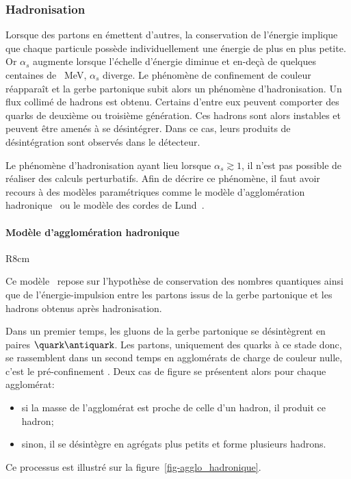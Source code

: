 \subsubsection{Hadronisation}\label{chapter-MSSM-formation_jets-subsec-hadronisation}
Lorsque des partons en émettent d'autres, la conservation de l'énergie implique que chaque particule possède individuellement une énergie de plus en plus petite.
Or $\alpha_s$ augmente lorsque l'échelle d'énergie diminue et en-deçà de quelques centaines de \SI{}{\MeV}, $\alpha_s$ diverge.
Le phénomène de confinement de couleur réapparaît et la gerbe partonique subit alors un phénomène d'hadronisation.
Un flux collimé de hadrons est obtenu.
Certains d'entre eux peuvent comporter des quarks de deuxième ou troisième génération. Ces hadrons sont alors instables et peuvent être amenés à se désintégrer.
Dans ce cas, leurs produits de désintégration sont observés dans le détecteur.
\par Le phénomène d'hadronisation ayant lieu lorsque $\alpha_s\gtrsim1$, il n'est pas possible de réaliser des calculs perturbatifs. Afin de décrire ce phénomène, il faut avoir recours à des modèles paramétriques comme
le modèle d'agglomération hadronique~\cite{Winter_2004}
ou
le modèle des cordes de Lund~\cite{Andersson_parton_fragmentation}.
\paragraph{Modèle d'agglomération hadronique}\label{chapter-MSSM-formation_jets-subsec-hadronisation-subsubsec-agglo_hadronique}
\begin{wrapfigure}{R}{8cm}
\centering

\caption[Formation de jets dans le cadre du modèle d'agglomération hadronique.]{Schématisation de l'hadronisation dans le cadre du modèle d'agglomération hadronique.}
\label{fig-agglo_hadronique}
\end{wrapfigure}
Ce modèle~\cite{Winter_2004} repose sur l'hypothèse de conservation des nombres quantiques ainsi que de l'énergie-impulsion entre les partons issus de la gerbe partonique et les hadrons obtenus après hadronisation.
\par Dans un premier temps, les gluons de la gerbe partonique se désintègrent en paires $\quark\antiquark$. Les partons, uniquement des quarks à ce stade donc, se rassemblent dans un second temps en agglomérats de charge de couleur nulle, c'est le \og pré-confinement \fg.
Deux cas de figure se présentent alors pour chaque agglomérat:
\begin{itemize}
\item si la masse de l'agglomérat est proche de celle d'un hadron, il produit ce hadron;
\item sinon, %
il se désintègre en agrégats plus petits et forme plusieurs hadrons.
\end{itemize}
Ce processus est illustré sur la figure~\ref{fig-agglo_hadronique}.
